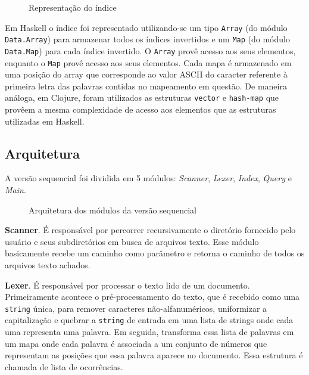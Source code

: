 \begin{figure}[h]
 \centering
 \def\svgwidth{0.6\columnwidth}
 
 \caption{Representação do índice}
 \label{fig:indice}
\end{figure}


Em Haskell o índice foi representado utilizando-se um tipo \verb|Array| (do módulo \verb|Data.Array|) para armazenar todos os índices invertidos e um \verb|Map| (do módulo \verb|Data.Map|) para cada índice invertido. O \verb|Array| provê acesso  aos seus elementos, enquanto o \verb|Map| provê acesso  aos seus elementos. Cada mapa é armazenado em uma posição do array que corresponde ao valor ASCII do caracter referente à primeira letra das palavras contidas no mapeamento em questão. De maneira análoga, em Clojure, foram utilizados as estruturas \verb|vector| e \verb|hash-map| que provêem a mesma complexidade de acesso aos elementos que as estruturas utilizadas em Haskell.

\subsection{Arquitetura}

A versão sequencial foi dividida em 5 módulos: \emph{Scanner}, \emph{Lexer}, \emph{Index}, \emph{Query} e \emph{Main}. 

\begin{figure}[h]
 \centering
 \def\svgwidth{0.5\columnwidth}
 
 \caption{Arquitetura dos módulos da versão sequencial}
\end{figure}

\textbf{Scanner}. É responsável por percorrer recursivamente o diretório fornecido pelo usuário e seus subdiretórios em busca de arquivos texto. Esse módulo basicamente recebe um caminho como parâmetro e retorna o caminho de todos os arquivos texto achados.

\textbf{Lexer}. É responsável por processar o texto lido de um documento. Primeiramente acontece o pré-processamento do texto, que é recebido como uma \verb|string| única, para remover caracteres não-alfanuméricos, uniformizar a capitalização e quebrar a \verb|string| de entrada em uma lista de strings onde cada uma representa uma palavra. Em seguida, transforma essa lista de palavras em um mapa onde cada palavra é associada a um conjunto de números que representam as posições que essa palavra aparece no documento. Essa estrutura é chamada de lista de ocorrências.

